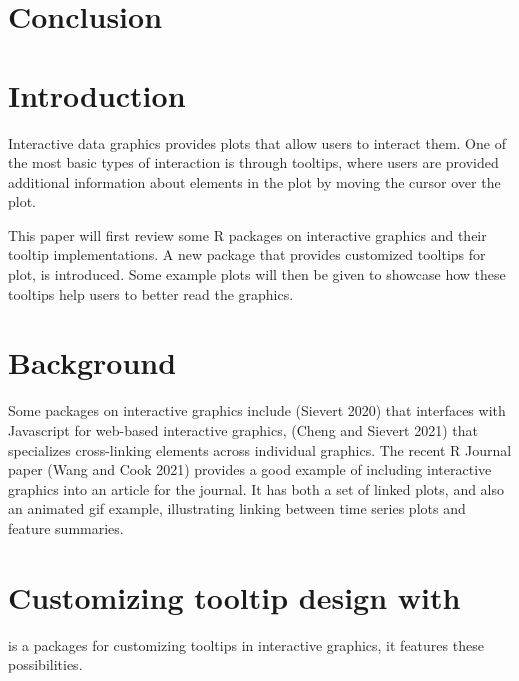 \hypertarget{conclusion}{%
\section{Conclusion}\label{conclusion}}

\hypertarget{introduction-1}{%
\section{Introduction}\label{introduction-1}}

Interactive data graphics provides plots that allow users to interact them. One of the most basic types of interaction is through tooltips, where users are provided additional information about elements in the plot by moving the cursor over the plot.

This paper will first review some R packages on interactive graphics and their tooltip implementations. A new package  that provides customized tooltips for plot, is introduced. Some example plots will then be given to showcase how these tooltips help users to better read the graphics.

\hypertarget{background-1}{%
\section{Background}\label{background-1}}

Some packages on interactive graphics include  (Sievert 2020) that interfaces with Javascript for web-based interactive graphics,  (Cheng and Sievert 2021) that specializes cross-linking elements across individual graphics. The recent R Journal paper  (Wang and Cook 2021) provides a good example of including interactive graphics into an article for the journal. It has both a set of linked plots, and also an animated gif example, illustrating linking between time series plots and feature summaries.

\hypertarget{customizing-tooltip-design-with}{%
\section{\texorpdfstring{Customizing tooltip design with }{Customizing tooltip design with }}\label{customizing-tooltip-design-with}}

 is a packages for customizing tooltips in interactive graphics, it features these possibilities.


